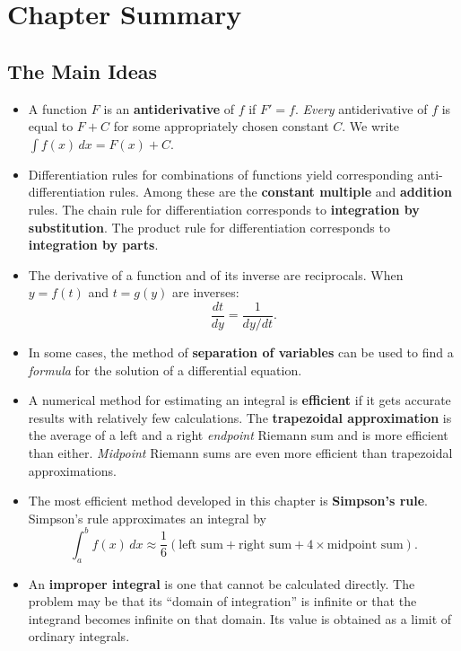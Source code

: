 \section{Chapter Summary}
\label{sec:chapter-summary}

\subsection{The Main Ideas}
\label{subsec:the-main-ideas}


\begin{itemize}

\item A function $F$ is an {\bf antiderivative} of $f$ if $F'=f$.
  {\em Every\/} antiderivative of $f$ is equal to $F+C$ for some
  appropriately chosen constant $C$.  We write $\int \! f(x) \, dx =
  F(x) +C$.

\item Differentiation rules for combinations of functions yield
  corresponding anti-differentiation rules.  Among these are the {\bf
    constant multiple} and {\bf addition} rules.  The chain rule for
  differentiation corresponds to {\bf integration by substitution}.
  The product rule for differentiation corresponds to {\bf integration
    by parts}.


\item The derivative of a function and of its inverse are reciprocals.
  When $y=f(t)$ and $t=g(y)$ are inverses:
\[
\dfrac{dt}{dy} = \frac{1}{dy/dt}.
\]

\item In some cases, the method of {\bf separation of variables} can
  be used to find a {\em formula\/} for the solution of a differential
  equation.

\item A numerical method for estimating an integral is {\bf efficient}
  if it gets accurate results with relatively few calculations.  The
  {\bf trapezoidal approximation} is the average of a left and a right
  {\em endpoint} Riemann sum and is more efficient than either.  {\em
    Midpoint} Riemann sums are even more efficient than trapezoidal
  approximations.

\item The most efficient method developed in this chapter is {\bf
  Simpson's rule}.  Simpson's rule approximates an integral by
\[
\int_a^b f(x) \, dx \approx \frac{1}{6}\left( \mbox{left sum} + \mbox{right sum} + 4 \times \mbox{midpoint sum} \right).
\]

\item An {\bf improper integral} is one that cannot be calculated
  directly.  The problem may be that its ``domain of integration'' is
  infinite or that the integrand becomes infinite on that domain.  Its
  value is obtained as a limit of ordinary integrals.

\end{itemize}



